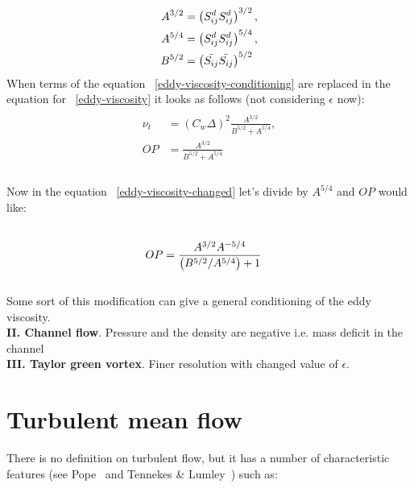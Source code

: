 \begin{equation}
\label{eddy-viscosity-conditioning}
\begin{split}
A^{3/2} &= \left({S_{ij}^{d}}{S_{ij}^{d}}\right)^{3/2},\\ A^{5/4} &= \left({S_{ij}^{d}}{S_{ij}^{d}}\right)^{5/4},\\ B^{5/2} &= \left(\bar{S_{ij}} \bar{S_{ij}}\right)^{5/2}\\
\end{split}
\end{equation}
When terms of the equation ~\ref{eddy-viscosity-conditioning} are replaced in the equation for ~\ref{eddy-viscosity} it looks as follows (not considering $\epsilon$ now):
\begin{equation}
\label{eddy-viscosity-changed}
\begin{split}\\
{\nu_t} &= \left({C_w}{\Delta}\right)^{2}
\frac{A^{3/2}}{B^{5/2} + {A^{5/4}}},\\
{OP} &= \frac{A^{3/2}}{B^{5/2} + {A^{5/4}}}\\
\end{split}
\end{equation}\\
Now in the equation ~\ref{eddy-viscosity-changed} let's divide by ${A^{5/4}}$ and ${OP}$ would like:
\begin{equation}
\label{some_modification}
\begin{split}\\
{OP} &= \frac{A^{3/2}A^{\--5/4}}{\left(B^{5/2}\// {A^{5/4}}\right) + 1}\\
\end{split}
\end{equation}\\
Some sort of this modification can give a general conditioning of the eddy viscosity.\\
{\bf II. Channel flow}.  Pressure and the density are negative i.e. mass deficit in the channel\\
{\bf III. Taylor green vortex}. Finer resolution with changed value of $\epsilon$. 

\newpage


\section{Turbulent mean flow}

There is no definition on turbulent flow, but it has a number of characteristic
features (see Pope~\cite{pope:book} and Tennekes \& Lumley~\cite{tennekes:lumley}) such as:

